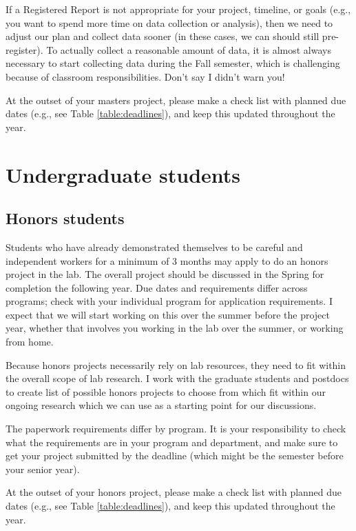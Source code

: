 \documentclass[letterpaper,12pt,oneside]{memoir}
\begin{document}
If a Registered Report is not appropriate for your project, timeline, or goals (e.g., you want to spend more time on data collection or analysis), then we need to adjust our plan and collect data sooner (in these cases, we can should still pre-register). To actually collect a reasonable amount of data, it is almost always necessary to start collecting data during the Fall semester, which is challenging because of classroom responsibilities. Don't say I didn't warn you!

At the outset of your masters project, please make a check list with planned due dates (e.g., see Table \ref{table:deadlines}), and keep this updated throughout the year.

\section{Undergraduate students}

\subsection{Honors students}

Students who have already demonstrated themselves to be careful and independent workers for a minimum of 3 months may apply to do an honors project in the lab. The overall project should be discussed in the Spring for completion the following year. Due dates and requirements differ across programs; check with your individual program for application requirements. I expect that we will start working on this over the summer before the project year, whether that involves you working in the lab over the summer, or working from home.

Because honors projects necessarily rely on lab resources, they need to fit within the overall scope of lab research. I work with the graduate students and postdocs to create list of possible honors projects to choose from which fit within our ongoing research which we can use as a starting point for our discussions.

The paperwork requirements differ by program. It is your responsibility to check what the requirements are in your program and department, and make sure to get your project submitted by the deadline (which might be the semester before your senior year).

At the outset of your honors project, please make a check list with planned due dates (e.g., see Table \ref{table:deadlines}), and keep this updated throughout the year.
\end{document}
